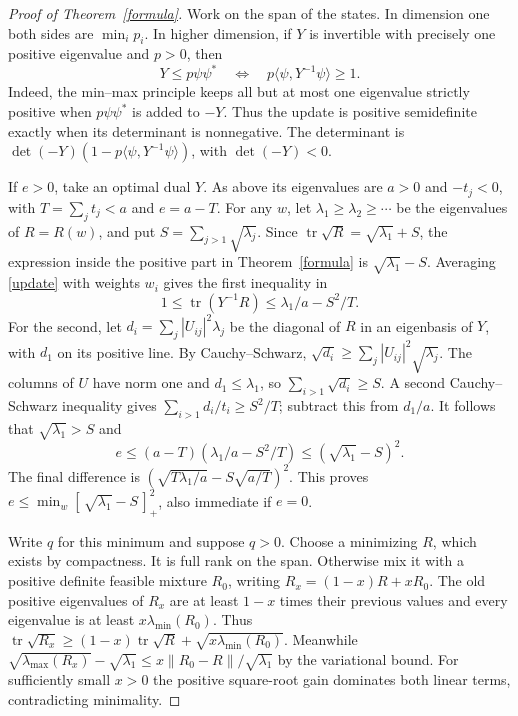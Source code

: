 \documentclass[11pt,a4paper]{article}
\theoremstyle{remark}
\newcommand{\tr}{\operatorname{tr}}
\begin{document}
\begin{proof}[Proof of Theorem~\ref{formula}]
Work on the span of the states. In dimension one both sides are \(\min_i p_i\). In higher dimension, if \(Y\) is invertible with precisely one positive eigenvalue and \(p>0\), then
\begin{equation}\label{update}
 Y\le p\psi\psi^*\quad\Longleftrightarrow\quad
                  p\langle\psi,Y^{-1}\psi\rangle\ge1 .
\end{equation}
Indeed, the min--max principle keeps all but at most one eigenvalue strictly positive when \(p\psi\psi^*\) is added to \(-Y\). Thus the update is positive semidefinite exactly when its determinant is nonnegative. The determinant is \(\det(-Y)(1-p\langle\psi,Y^{-1}\psi\rangle)\), with \(\det(-Y)<0\).

If \(e>0\), take an optimal dual \(Y\). As above its eigenvalues are \(a>0\) and \(-t_j<0\), with \(T=\sum_jt_j<a\) and \(e=a-T\). For any \(w\), let \(\lambda_1\ge\lambda_2\ge\cdots\) be the eigenvalues of \(R=R(w)\), and put \(S=\sum_{j>1}\sqrt{\lambda_j}\). Since \(\tr\sqrt R=\sqrt{\lambda_1}+S\), the expression inside the positive part in Theorem~\ref{formula} is \(\sqrt{\lambda_1}-S\). Averaging \eqref{update} with weights \(w_i\) gives the first inequality in
\[
             1\le\tr(Y^{-1}R)\le\lambda_1/a-S^2/T .
\]
For the second, let \(d_i=\sum_j |U_{ij}|^2\lambda_j\) be the diagonal of \(R\) in an eigenbasis of \(Y\), with \(d_1\) on its positive line. By Cauchy--Schwarz, \(\sqrt{d_i}\ge\sum_j|U_{ij}|^2\sqrt{\lambda_j}\). The columns of \(U\) have norm one and \(d_1\le\lambda_1\), so \(\sum_{i>1}\sqrt{d_i}\ge S\). A second Cauchy--Schwarz inequality gives \(\sum_{i>1}d_i/t_i\ge S^2/T\); subtract this from \(d_1/a\). It follows that \(\sqrt{\lambda_1}>S\) and
\[
 e\le(a-T)(\lambda_1/a-S^2/T)\le(\sqrt{\lambda_1}-S)^2 .
\]
The final difference is \((\sqrt{T\lambda_1/a}-S\sqrt{a/T})^2\). This proves \(e\le\min_w[\,\sqrt{\lambda_1}-S\,]_+^2\), also immediate if \(e=0\).

Write \(q\) for this minimum and suppose \(q>0\). Choose a minimizing \(R\), which exists by compactness. It is full rank on the span. Otherwise mix it with a positive definite feasible mixture \(R_0\), writing \(R_x=(1-x)R+xR_0\). The old positive eigenvalues of \(R_x\) are at least \(1-x\) times their previous values and every eigenvalue is at least \(x\lambda_{\min}(R_0)\). Thus \(\tr\sqrt{R_x}\ge(1-x)\tr\sqrt R+\sqrt{x\lambda_{\min}(R_0)}\). Meanwhile \(\sqrt{\lambda_{\max}(R_x)}-\sqrt{\lambda_1}\le x\|R_0-R\|/\sqrt{\lambda_1}\) by the variational bound. For sufficiently small \(x>0\) the positive square-root gain dominates both linear terms, contradicting minimality.


\end{proof}
\end{document}
